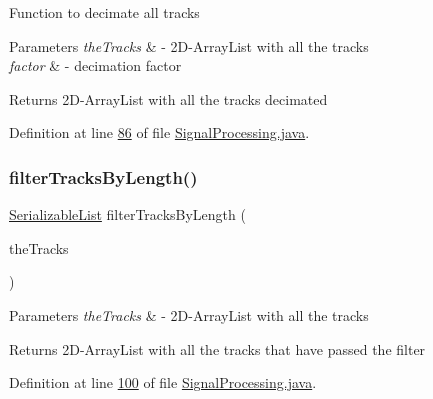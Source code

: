 Function to decimate all tracks


\begin{DoxyParams}{Parameters}
{\em the\+Tracks} & -\/ 2\+D-\/\+Array\+List with all the tracks \\
\hline
{\em factor} & -\/ decimation factor \\
\hline
\end{DoxyParams}
\begin{DoxyReturn}{Returns}
2\+D-\/\+Array\+List with all the tracks decimated 
\end{DoxyReturn}


Definition at line \hyperlink{_signal_processing_8java_source_l00086}{86} of file \hyperlink{_signal_processing_8java_source}{Signal\+Processing.\+java}.

\hypertarget{classfunctions_1_1_signal_processing_a032b1dff0d4763927928158714db911f}{}\label{classfunctions_1_1_signal_processing_a032b1dff0d4763927928158714db911f} 
\subsubsection{\texorpdfstring{filter\+Tracks\+By\+Length()}{filterTracksByLength()}}
{\footnotesize\ttfamily \hyperlink{classdata_1_1_serializable_list}{Serializable\+List} filter\+Tracks\+By\+Length (\begin{DoxyParamCaption}\item[{\hyperlink{classdata_1_1_serializable_list}{Serializable\+List}}]{the\+Tracks }\end{DoxyParamCaption})}


\begin{DoxyParams}{Parameters}
{\em the\+Tracks} & -\/ 2\+D-\/\+Array\+List with all the tracks \\
\hline
\end{DoxyParams}
\begin{DoxyReturn}{Returns}
2\+D-\/\+Array\+List with all the tracks that have passed the filter 
\end{DoxyReturn}


Definition at line \hyperlink{_signal_processing_8java_source_l00100}{100} of file \hyperlink{_signal_processing_8java_source}{Signal\+Processing.\+java}.

\hypertarget{classfunctions_1_1_signal_processing_a7302e4cf91bc23463aa9354325d2993d}{}\label{classfunctions_1_1_signal_processing_a7302e4cf91bc23463aa9354325d2993d} 

